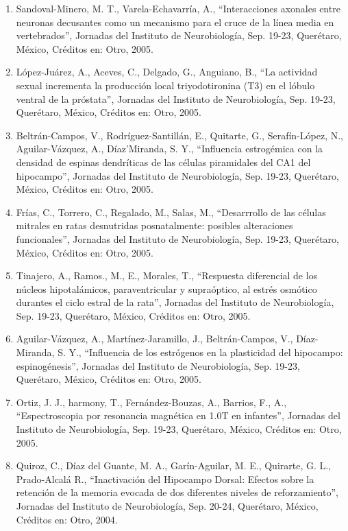 \begin{enumerate}
\item Sandoval-Minero, M. T., Varela-Echavarría, A., “Interacciones axonales entre neuronas decusantes como un mecanismo para el cruce de la línea media en 
vertebrados”, Jornadas del Instituto de Neurobiología, Sep. 19-23, Querétaro, México, Créditos en: Otro, 2005.

\item López-Juárez, A., Aceves, C., Delgado, G., Anguiano, B., “La actividad sexual incrementa la producción local triyodotironina (T3) en el lóbulo ventral de 
la 
próstata”, Jornadas del Instituto de Neurobiología, Sep. 19-23, Querétaro, México, Créditos en: Otro, 2005.

\item Beltrán-Campos, V., Rodríguez-Santillán, E., Quitarte, G., Serafín-López, N., Aguilar-Vázquez, A., Díaz’Miranda, S. Y., “Influencia estrogémica con la 
densidad 
de espinas dendríticas de las células piramidales del CA1 del hipocampo”, Jornadas del Instituto de Neurobiología, Sep. 19-23, Querétaro, México, Créditos en: 
Otro, 2005.

\item Frías, C., Torrero, C., Regalado, M., Salas, M., “Desarrrollo de las células mitrales en ratas desnutridas posnatalmente: posibles alteraciones 
funcionales”, 
Jornadas del Instituto de Neurobiología, Sep. 19-23, Querétaro, México, Créditos en: Otro, 2005.

\item Tinajero, A., Ramos., M., E., Morales, T., “Respuesta diferencial de los núcleos hipotalámicos, paraventricular y supraóptico, al estrés osmótico durantes 
el 
ciclo estral de la rata”, Jornadas del Instituto de Neurobiología, Sep. 19-23, Querétaro, México, Créditos en: Otro, 2005.

\item Aguilar-Vázquez, A., Martínez-Jaramillo, J., Beltrán-Campos, V., Díaz-Miranda, S. Y., “Influencia de los estrógenos en la plasticidad del hipocampo: 
espinogénesis”, Jornadas del Instituto de Neurobiología, Sep. 19-23, Querétaro, México, Créditos en: Otro, 2005.

\item Ortiz, J. J., harmony, T., Fernández-Bouzas, A., Barrios, F., A., “Espectroscopia por resonancia magnética en 1.0T en infantes”, Jornadas del Instituto de 
Neurobiología, Sep. 19-23, Querétaro, México, Créditos en: Otro, 2005.

\item Quiroz, C., Díaz del Guante, M. A., Garín-Aguilar, M. E., Quirarte, G. L., Prado-Alcalá R., “Inactivación del Hipocampo Dorsal: Efectos sobre la retención 
de la 
memoria evocada de dos diferentes niveles de reforzamiento”, Jornadas del Instituto de Neurobiología, Sep. 20-24, Querétaro, México, Créditos en: Otro, 2004.


\end{enumerate}
